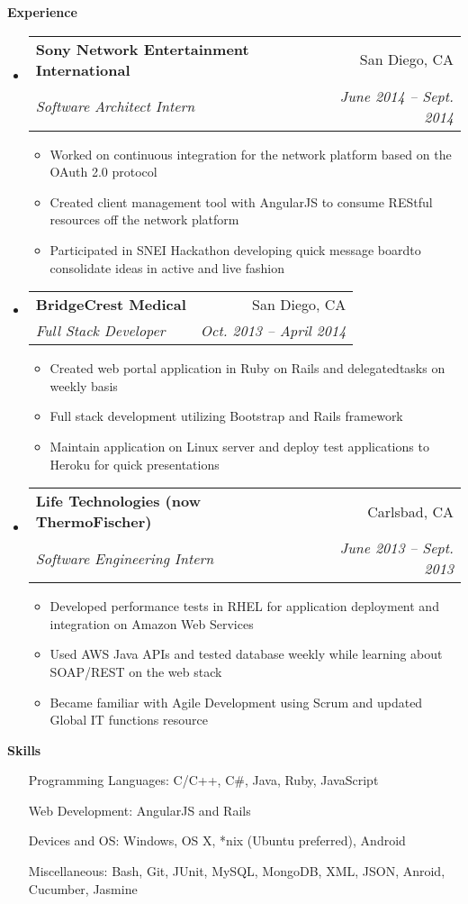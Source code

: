 \documentclass[letterpaper,11pt]{article}
\makeatletter
\newcommand{\resitem}[1]{\item #1 \vspace{-2pt}}
\newcommand{\resheading}[1]{{\large \colorbox{mygrey}{\begin{minipage}{\textwidth}{\textbf{#1 \vphantom{p\^{E}}}}\end{minipage}}}}
\newcommand{\ressubheading}[4]{
\begin{tabular*}{6.5in}{l@{\extracolsep{\fill}}r}
		\textbf{#1} & #2 \\
		\textit{#3} & \textit{#4} \\
\end{tabular*}\vspace{-6pt}}
\makeatother
\begin{document}
\resheading{Experience}
  \begin{itemize}
    \item 
      \ressubheading{Sony Network Entertainment International}{San Diego, CA}{Software Architect Intern}{June 2014 -- Sept. 2014}
      { \footnotesize
        \begin{itemize}
          \resitem{Worked on continuous integration for the network platform based on the OAuth 2.0 protocol}
	  \resitem{Created client management tool with AngularJS to consume REStful resources off the network platform}
          \resitem{Participated in SNEI Hackathon developing quick message boardto consolidate ideas in active and live fashion}
        \end{itemize}
      }
    \item
      \ressubheading{BridgeCrest Medical}{San Diego, CA}{Full Stack Developer}{Oct. 2013 -- April 2014}
      { \footnotesize
        \begin{itemize}
	  \resitem{Created web portal application in Ruby on Rails and delegatedtasks on weekly basis}
	  \resitem{Full stack development utilizing Bootstrap and Rails
framework}	
          \resitem{Maintain application on Linux server and deploy test applications to Heroku for quick presentations}
	\end{itemize}
      }
    \item
      \ressubheading{Life Technologies (now ThermoFischer)}{Carlsbad, CA}{Software Engineering Intern}{June 2013 -- Sept. 2013}
        { \footnotesize
	  \begin{itemize}
	    \resitem{Developed performance tests in RHEL for application deployment and integration on Amazon Web Services}
	    \resitem{Used AWS Java APIs and tested database weekly while learning about SOAP/REST on the web stack}
	    \resitem{Became familiar with Agile Development using Scrum and updated Global IT functions resource}
          \end{itemize}
        }
  \end{itemize}  %

\resheading{Skills}
  \begin{itemize}
    \item[Programming Languages:]
    { \footnotesize
      C/C++, C\#, Java, Ruby, JavaScript
    }
    \item[Web Development:]
    { \footnotesize
      AngularJS and Rails
    }
    \item[Devices and OS:]
    { \footnotesize
      Windows, OS X, *nix (Ubuntu preferred), Android
    }
    \item[Miscellaneous:]
    { \footnotesize
      Bash, Git, JUnit, MySQL, MongoDB, XML, JSON, Anroid, Cucumber, Jasmine
    }
  \end{itemize} %
\end{document}
